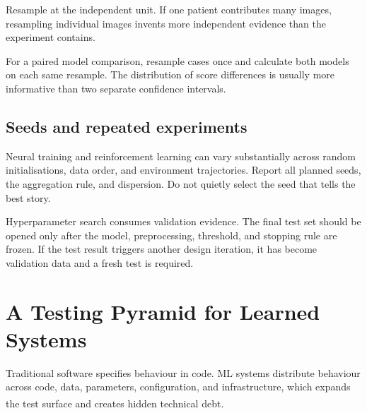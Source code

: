 Resample at the independent unit.
If one patient contributes many images, resampling individual images invents
more independent evidence than the experiment contains.

\begin{engineernote}
For a paired model comparison, resample cases once and calculate both models
on each same resample.
The distribution of score differences is usually more informative than two
separate confidence intervals.
\end{engineernote}

\subsection{Seeds and repeated experiments}

Neural training and reinforcement learning can vary substantially across
random initialisations, data order, and environment trajectories.
Report all planned seeds, the aggregation rule, and dispersion.
Do not quietly select the seed that tells the best story.

Hyperparameter search consumes validation evidence.
The final test set should be opened only after the model, preprocessing,
threshold, and stopping rule are frozen.
If the test result triggers another design iteration, it has become validation
data and a fresh test is required.

\section{A Testing Pyramid for Learned Systems}

Traditional software specifies behaviour in code.
ML systems distribute behaviour across code, data, parameters, configuration,
and infrastructure, which expands the test surface and creates hidden
technical debt.\textsuperscript{\cite{sculleyHiddenTechnicalDebt2015}}

\begin{center}
\label{fig:ml-testing-pyramid}
\end{center}

